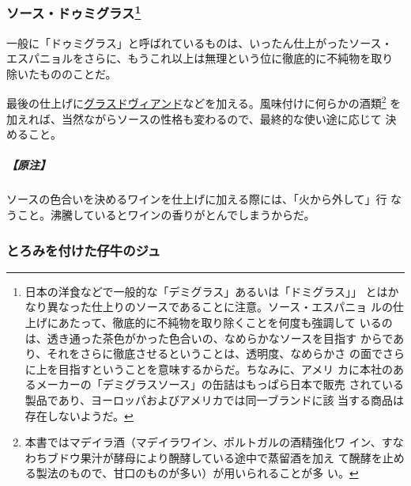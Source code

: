 \begin{recette}
\maeaki

\hypertarget{sauce-demi-glace}{%
\subsubsection[ソース・ドゥミグラス]{\texorpdfstring{ソース・ドゥミグラス\footnote{日本の洋食などで一般的な「デミグラス」あるいは「ドミグラス」」
  とはかなり異なった仕上りのソースであることに注意。ソース・エスパニョ
  ルの仕上げにあたって、徹底的に不純物を取り除くことを何度も強調して
  いるのは、透き通った茶色がかった色合いの、なめらかなソースを目指す
  からであり、それをさらに徹底させるということは、透明度、なめらかさ
  の面でさらに上を目指すということを意味するからだ。ちなみに、アメリ
  カに本社のあるメーカーの「デミグラスソース」の缶詰はもっぱら日本で販売
  されている製品であり、ヨーロッパおよびアメリカでは同一ブランドに該
  当する商品は存在しないようだ。}}{ソース・ドゥミグラス}}\label{sauce-demi-glace}}



一般に「ドゥミグラス」と呼ばれているものは、いったん仕上がったソース・
エスパニョルをさらに、もうこれ以上は無理という位に徹底的に不純物を取り
除いたもののことだ。

最後の仕上げに\protect\hyperlink{glace-de-viande}{グラスドヴィアンド}などを加える。風味付けに何らかの酒類\footnote{本書ではマデイラ酒（マデイラワイン、ポルトガルの酒精強化ワ
  イン、すなわちブドウ果汁が酵母により醗酵している途中で蒸留酒を加え
  て醗酵を止める製法のもので、甘口のものが多い）が用いられることが多
  い。}
を加えれば、当然ながらソースの性格も変わるので、最終的な使い途に応じて
決めること。

\hypertarget{nota-sauce-demi-glace}{%
\subparagraph{【原注】}\label{nota-sauce-demi-glace}}

ソースの色合いを決めるワインを仕上げに加える際には、「火から外して」行
なうこと。沸騰しているとワインの香りがとんでしまうからだ。

\maeaki

\hypertarget{jus-de-veau-lie}{%
\subsubsection{とろみを付けた仔牛のジュ}\label{jus-de-veau-lie}}


\end{recette}
